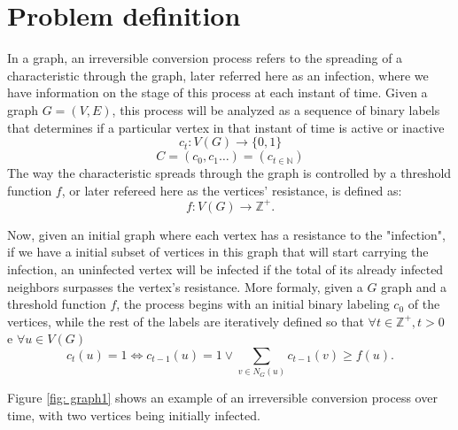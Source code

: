 
\section{Problem definition}

In a graph, an irreversible conversion process refers to the spreading of a characteristic through the graph, later referred here as an infection, where we have information on the stage of this process at each instant of time.  
Given a graph $G = (V, E)$, this process will be analyzed as a sequence of binary labels that determines if a particular vertex in that instant of time is active or inactive
\begin{equation}
c_{t}: V(G) \rightarrow \{0,1\}
\end{equation}
\begin{equation}
C = (c_{0}, c_{1} \dots )= (c_{t \in \mathbb{N}})
\end{equation}
The way the characteristic spreads through the graph is controlled by a threshold function $ f $, or later refereed here as the vertices' resistance, is defined as:
\begin{equation}
f: V (G) \rightarrow \mathbb{Z}^+.
\end{equation}

Now, given an initial graph where each vertex has a resistance to the "infection", if we have a initial subset of vertices in this graph that will start carrying the infection, an uninfected vertex will be infected if the total of its already infected neighbors surpasses the vertex's resistance. More formaly, given a $ G $ graph and a threshold function $ f $, the process begins with an initial binary labeling $ c_{0} $ of the vertices, while the rest of the labels are iteratively defined so that $\forall t \in \mathbb{Z}^+, t > 0$ e  $\forall u \in V(G)$
\begin{equation}
c_{t}(u) = 1 \iff  c_{t-1}(u) = 1 \lor \sum_{v \in N_{G}(u)} c_{t-1}(v)  \geq f(u). 
\end{equation}



Figure \ref{fig: graph1} shows an example of an irreversible conversion process over time, with two vertices being initially infected.

